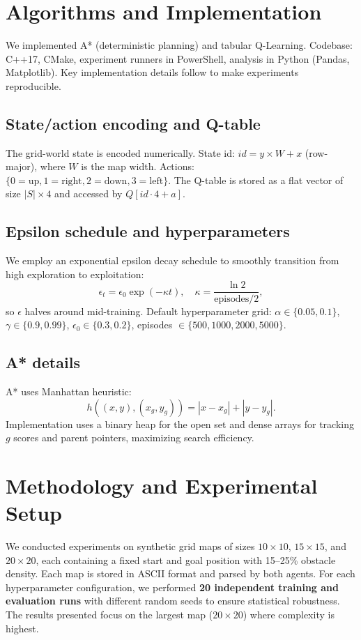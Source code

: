 \documentclass[conference]{IEEEtran}
\begin{document}
	\section{Algorithms and Implementation}
	We implemented A* (deterministic planning) and tabular Q-Learning. Codebase: C++17, CMake, experiment runners in PowerShell, analysis in Python (Pandas, Matplotlib). Key implementation details follow to make experiments reproducible.
	
	\subsection{State/action encoding and Q-table}
	The grid-world state is encoded numerically. State id: $id = y \times W + x$ (row-major), where $W$ is the map width. Actions: $\{0=\mathrm{up},1=\mathrm{right},2=\mathrm{down},3=\mathrm{left}\}$. The Q-table is stored as a flat vector of size $|S|\times 4$ and accessed by $Q[id \cdot 4 + a]$.
	
	\subsection{Epsilon schedule and hyperparameters}
	We employ an exponential epsilon decay schedule to smoothly transition from high exploration to exploitation:
	\[
	\epsilon_t = \epsilon_0 \exp(-\kappa t),\quad \kappa=\frac{\ln 2}{\mathrm{episodes}/2},
	\]
	so $\epsilon$ halves around mid-training. Default hyperparameter grid: $\alpha\in\{0.05,0.1\}$, $\gamma\in\{0.9,0.99\}$, $\epsilon_0\in\{0.3,0.2\}$, episodes $\in\{500,1000,2000,5000\}$.
	
	\subsection{A* details}
	A* uses Manhattan heuristic:
	\[
	h((x,y),(x_g,y_g)) = |x-x_g| + |y-y_g|.
	\]
	Implementation uses a binary heap for the open set and dense arrays for tracking $g$ scores and parent pointers, maximizing search efficiency.
	
	\section{Methodology and Experimental Setup}
	We conducted experiments on synthetic grid maps of sizes $10\times10$, $15\times15$, and $20\times20$, each containing a fixed start and goal position with 15--25\% obstacle density. Each map is stored in ASCII format and parsed by both agents. For each hyperparameter configuration, we performed \textbf{20 independent training and evaluation runs} with different random seeds to ensure statistical robustness. The results presented focus on the largest map ($20\times20$) where complexity is highest.
	
\end{document}
